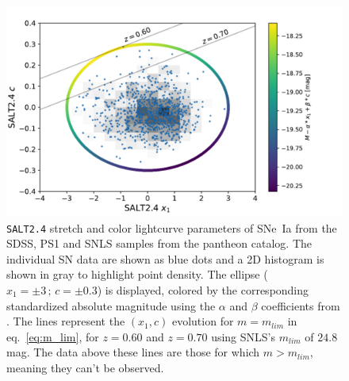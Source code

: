 \documentclass[]{aa} %
\newcommand{\nn}[1]{{\textcolor[rgb]{1, 0.27, 0}{#1}}}
\begin{document}
\begin{figure}
    \centering
    \includegraphics[width=0.95\linewidth]{Article_figures/zmax_maglim_snls.pdf}
    \caption{\textsc{\texttt{SALT2.4}} stretch and color lightcurve parameters
        of SNe~Ia from the SDSS, PS1 and SNLS samples from the pantheon catalog.
        The individual SN data are shown as blue dots and a 2D histogram is
        shown in gray to highlight point density. The ellipse
        ($x_1=\pm3\,\mathrm{;}\,c=\pm0.3$) is displayed, colored by the
        corresponding standardized absolute magnitude using the $\alpha$ and
        $\beta$ coefficients from \citep{scolnic2018a}. \nn{The lines represent
        the $(x_1, c)$ evolution for $m = m_{lim}$ in eq.~\ref{eq:m_lim},
    for $z=0.60$ and $z=0.70$ using SNLS's $m_{lim}$ of $24.8\,$mag. The data
    above these lines are those for which $m > m_{lim}$, meaning they can't be
    observed.}}
    \label{fig:maglim}
\end{figure}
\end{document}
